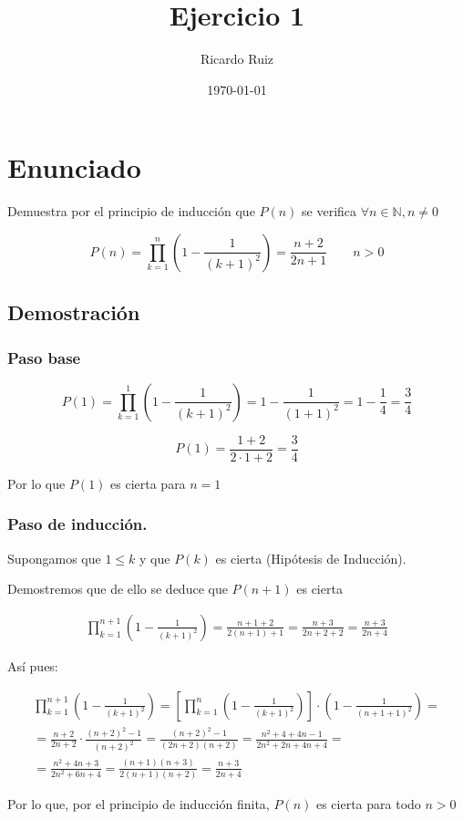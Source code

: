 \documentclass[11pt]{article}
\author{Ricardo Ruiz}
\date{\today}
\title{Ejercicio 1}
\begin{document}
\maketitle

\section{Enunciado}
\label{sec-1}

Demuestra por el principio de inducción que $P(n)$ se 
verifica $\forall n \in \mathbb{N}, n \neq 0$

\[
P(n) = \prod_{k=1}^n \left(1 - \frac{1}{(k+1)^2}\right)
= \frac{n+2}{2n+1} \quad \quad n > 0
\]


\subsection{Demostración}
\label{sec-1-1}

\subsubsection{Paso base}
\label{sec-1-1-1}

\[
P(1) = \prod_{k=1}^1 \left(1 - \frac{1}{(k+1)^2}\right) 
= 1 - \frac{1}{(1+1)^2} = 1 - \frac{1}{4} = \frac{3}{4}
\]

\[
P(1) = \frac{1+2}{2\cdot1+2} = \frac{3}{4}
\]

Por lo que $P(1)$ es cierta para $n=1$

\subsubsection{Paso de inducción.}
\label{sec-1-1-2}
Supongamos que $1\leq k$ y que $P(k)$ es cierta (Hipótesis de
Inducción).

Demostremos que de ello se deduce que $P(n+1)$ es cierta

\begin{eqnarray*}
\prod_{k=1}^{n+1} \left(1 - \frac{1}{(k+1)^2}\right) = 
\frac{n+1+2}{2(n+1)+1} = \frac{n+3}{2n+2+2} = \frac{n+3}{2n+4}
\end{eqnarray*}

Así pues:

\begin{align*}
\prod_{k=1}^{n+1} \left(1 - \frac{1}{(k+1)^2}\right)
= \left[\prod_{k=1}^n \left(1 - \frac{1}{(k+1)^2}\right)\right]
\cdot \left(1-\frac{1}{(n+1+1)^2}\right) = \\
= \frac{n+2}{2n+2} \cdot \frac{(n+2)^2-1}{(n+2)^2}
= \frac{(n+2)^2-1}{(2n+2)(n+2)}
= \frac{n^2+4+4n-1}{2n^2+2n+4n+4} = \\
= \frac{n^2+4n+3}{2n^2+6n+4}
= \frac{(n+1)(n+3)}{2(n+1)(n+2)}
= \frac{n+3}{2n+4}
\end{align*}


Por lo que, por el principio de inducción finita, $P(n)$
es cierta para todo $n>0$
\end{document}
